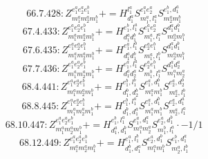 \documentclass[letterpaper,10pt,fleqn,leqno,onecolumn]{article}
\begin{document}
\begin{equation} \;\;\;\;\;\;  66.7.428: Z^{e_{1}^{a}e_{2}^{a}e_{1}^{b}}_{m_{1}^{a}m_{2}^{a}m_{1}^{b}}+=H^{l_{1}^{a}}_{d_{1}^{a}}S^{e_{1}^{a}e_{2}^{a}}_{m_{1}^{a},l_{1}^{a}}S^{e_{1}^{b},d_{1}^{a}}_{m_{2}^{a}m_{1}^{b}} \end{equation}
\begin{equation} \;\;\;\;\;\;  67.4.433: Z^{e_{1}^{a}e_{2}^{a}e_{1}^{b}}_{m_{1}^{a}m_{2}^{a}m_{1}^{b}}+=H^{e_{1}^{b},l_{1}^{a}}_{d_{1}^{a}d_{1}^{b}}S^{e_{1}^{a}e_{2}^{a}}_{m_{1}^{a},l_{1}^{a}}S^{d_{1}^{a}d_{1}^{b}}_{m_{2}^{a}m_{1}^{b}} \end{equation}
\begin{equation} \;\;\;\;\;\;  67.6.435: Z^{e_{1}^{a}e_{2}^{a}e_{1}^{b}}_{m_{1}^{a}m_{2}^{a}m_{1}^{b}}+=H^{e_{1}^{a},l_{1}^{b}}_{d_{1}^{a}d_{1}^{b}}S^{e_{2}^{a}e_{1}^{b}}_{m_{1}^{a},l_{1}^{b}}S^{d_{1}^{a}d_{1}^{b}}_{m_{2}^{a}m_{1}^{b}} \end{equation}
\begin{equation} \;\;\;\;\;\;  67.7.436: Z^{e_{1}^{a}e_{2}^{a}e_{1}^{b}}_{m_{1}^{a}m_{2}^{a}m_{1}^{b}}+=H^{e_{1}^{a},l_{1}^{a}}_{d_{1}^{a}d_{2}^{a}}S^{e_{2}^{a}e_{1}^{b}}_{m_{1}^{b},l_{1}^{a}}S^{d_{1}^{a}d_{2}^{a}}_{m_{1}^{a}m_{2}^{a}} \end{equation}
\begin{equation} \;\;\;\;\;\;  68.4.441: Z^{e_{1}^{a}e_{2}^{a}e_{1}^{b}}_{m_{1}^{a}m_{2}^{a}m_{1}^{b}}+=H^{e_{1}^{b},l_{1}^{b}}_{d_{1}^{b},d_{2}^{b}}S^{e_{1}^{a},d_{1}^{b}}_{m_{1}^{a}m_{1}^{b}}S^{e_{2}^{a},d_{2}^{b}}_{m_{2}^{a},l_{1}^{b}} \end{equation}
\begin{equation} \;\;\;\;\;\;  68.8.445: Z^{e_{1}^{a}e_{2}^{a}e_{1}^{b}}_{m_{1}^{a}m_{2}^{a}m_{1}^{b}}+=H^{e_{1}^{b},l_{1}^{a}}_{d_{1}^{b},d_{1}^{a}}S^{e_{1}^{a},d_{1}^{b}}_{m_{1}^{a}m_{1}^{b}}S^{e_{2}^{a},d_{1}^{a}}_{m_{2}^{a},l_{1}^{a}} \end{equation}
\begin{equation} \;\;\;\;\;\;  68.10.447: Z^{e_{1}^{a}e_{2}^{a}e_{1}^{b}}_{m_{1}^{a}m_{2}^{a}m_{1}^{b}}+=H^{e_{1}^{b},l_{1}^{a}}_{d_{1}^{a},d_{1}^{b}}S^{e_{1}^{a},d_{1}^{a}}_{m_{1}^{a}m_{2}^{a}}S^{e_{2}^{a},d_{1}^{b}}_{m_{1}^{b},l_{1}^{a}}\cdot -1/1 \end{equation}
\begin{equation} \;\;\;\;\;\;  68.12.449: Z^{e_{1}^{a}e_{2}^{a}e_{1}^{b}}_{m_{1}^{a}m_{2}^{a}m_{1}^{b}}+=H^{e_{1}^{a},l_{1}^{b}}_{d_{1}^{b},d_{1}^{a}}S^{e_{2}^{a},d_{1}^{b}}_{m_{1}^{a}m_{1}^{b}}S^{e_{1}^{b},d_{1}^{a}}_{m_{2}^{a},l_{1}^{b}} \end{equation}
\end{document}
